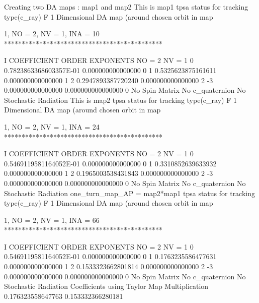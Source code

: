 \documentclass{hitec}     %
\begin{document}
{{{{{\begin{code}
 Creating two DA maps : map1 and map2
  This is map1
  tpsa status for tracking type(c_ray)  F
           1  Dimensional DA map (around chosen orbit in map%

          1, NO =    2, NV =    1, INA =   10
 *********************************************

    I  COEFFICIENT          ORDER   EXPONENTS
      NO =     2      NV =     1
   0  0.7823863368603357E-01   0.000000000000000       0
   1  0.5325623875161611       0.000000000000000       1
   2  0.2947893387720240       0.000000000000000       2
    -3   0.000000000000000       0.000000000000000       0
  No Spin Matrix
  No c_quaternion
 No Stochastic Radiation
  This is map2
  tpsa status for tracking type(c_ray)  F
           1  Dimensional DA map (around chosen orbit in map%

          1, NO =    2, NV =    1, INA =   24
 *********************************************

    I  COEFFICIENT          ORDER   EXPONENTS
      NO =     2      NV =     1
   0  0.5469119581164052E-01   0.000000000000000       0
   1  0.3310852639633932       0.000000000000000       1
   2  0.1965003538431843       0.000000000000000       2
    -3   0.000000000000000       0.000000000000000       0
  No Spin Matrix
  No c_quaternion
 No Stochastic Radiation
 one_turn_map_AP = map2*map1
  tpsa status for tracking type(c_ray)  F
           1  Dimensional DA map (around chosen orbit in map%

          1, NO =    2, NV =    1, INA =   66
 *********************************************

    I  COEFFICIENT          ORDER   EXPONENTS
      NO =     2      NV =     1
   0  0.5469119581164052E-01   0.000000000000000       0
   1  0.1763235586477631       0.000000000000000       1
   2  0.1533323662801814       0.000000000000000       2
    -3   0.000000000000000       0.000000000000000       0
  No Spin Matrix
  No c_quaternion
 No Stochastic Radiation
 Coefficients using Taylor Map Multiplication
  0.176323558647763       0.153332366280181
\end{code}

}}}}}
\end{document}
